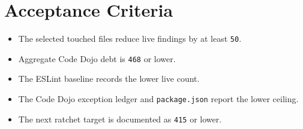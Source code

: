 \section{Acceptance Criteria}\label{record-240-acceptance-criteria}

\begin{itemize}
\tightlist
\item
  The selected touched files reduce live findings by at least \texttt{5\allowbreak{}0}.
\item
  Aggregate Code Dojo debt is \texttt{4\allowbreak{}6\allowbreak{}8} or lower.
\item
  The ESLint baseline records the lower live count.
\item
  The Code Dojo exception ledger and \texttt{p\allowbreak{}a\allowbreak{}c\allowbreak{}k\allowbreak{}a\allowbreak{}g\allowbreak{}e\allowbreak{}.\allowbreak{}j\allowbreak{}s\allowbreak{}o\allowbreak{}n} report the lower ceiling.
\item
  The next ratchet target is documented as \texttt{4\allowbreak{}1\allowbreak{}5} or lower.
\end{itemize}

